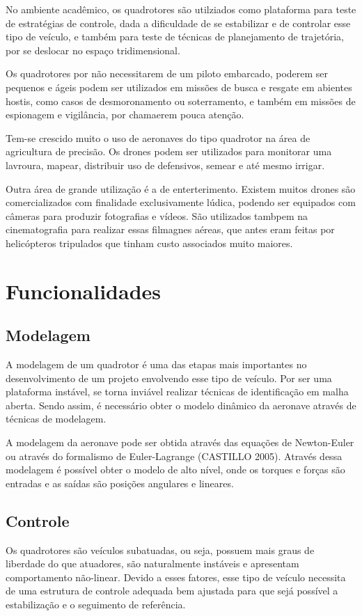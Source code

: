 No ambiente acadêmico, os quadrotores são utilziados como plataforma para teste de estratégias de controle, dada a dificuldade de se estabilizar e de controlar esse tipo de veículo, e também para teste de técnicas de planejamento de trajetória, por se deslocar no espaço tridimensional.

Os quadrotores por não necessitarem de um piloto embarcado, poderem ser pequenos e ágeis podem ser utilizados em missões de busca e resgate em abientes hostis, como casos de desmoronamento ou soterramento, e também em missões de espionagem e vigilância, por chamaerem pouca atenção.

Tem-se crescido muito o uso de aeronaves do tipo quadrotor na área de agricultura de precisão. Os drones podem ser utilizados para monitorar uma lavroura, mapear, distribuir uso de defensivos, semear e até mesmo irrigar.

Outra área de grande utilização é a de enterterimento. Existem muitos drones são comercializados com finalidade exclusivamente lúdica, podendo ser equipados com câmeras para produzir fotografias e vídeos. São utilizados tambpem na cinematografia para realizar essas filmagnes aéreas, que antes eram feitas por helicópteros tripulados que tinham custo associados muito maiores.


\section{Funcionalidades}

\subsection{Modelagem}
A modelagem de um quadrotor é uma das etapas mais importantes no desenvolvimento de um projeto envolvendo esse tipo de veículo. Por ser uma plataforma instável, se torna inviável realizar técnicas de identificação em malha aberta. Sendo assim, é necessário obter o modelo dinâmico da aeronave através de técnicas de modelagem.

A modelagem da aeronave pode ser obtida através das equações de Newton-Euler ou através do formalismo de Euler-Lagrange (CASTILLO 2005). Através dessa modelagem é possível obter o modelo de alto nível, onde os torques e forças são entradas e as saídas são posições angulares e lineares. 

\subsection{Controle}
Os quadrotores são veículos subatuadas, ou seja, possuem mais graus de liberdade do que atuadores, são naturalmente instáveis e apresentam comportamento não-linear. Devido a esses fatores, esse tipo de veículo necessita de uma estrutura de controle adequada bem ajustada para que sejá possível a estabilização e o seguimento de referência.

